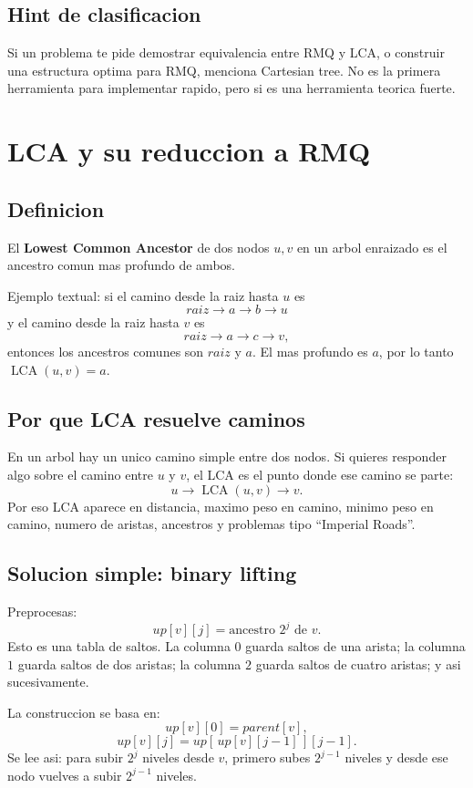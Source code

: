 \documentclass[10pt]{article}
\newcommand{\LCA}{\operatorname{LCA}}
\begin{document}
\subsection{Hint de clasificacion}
Si un problema te pide demostrar equivalencia entre RMQ y LCA, o construir una
estructura optima para RMQ, menciona Cartesian tree. No es la primera herramienta
para implementar rapido, pero si es una herramienta teorica fuerte.

\newpage
\section{LCA y su reduccion a RMQ}

\subsection{Definicion}
El \textbf{Lowest Common Ancestor} de dos nodos $u,v$ en un arbol enraizado es
el ancestro comun mas profundo de ambos.

Ejemplo textual: si el camino desde la raiz hasta $u$ es
\[
raiz\to a\to b\to u
\]
y el camino desde la raiz hasta $v$ es
\[
raiz\to a\to c\to v,
\]
entonces los ancestros comunes son $raiz$ y $a$. El mas profundo es $a$, por lo
tanto $\LCA(u,v)=a$.

\subsection{Por que LCA resuelve caminos}
En un arbol hay un unico camino simple entre dos nodos. Si quieres responder
algo sobre el camino entre $u$ y $v$, el LCA es el punto donde ese camino se
parte:
\[
u \to \LCA(u,v) \to v.
\]
Por eso LCA aparece en distancia, maximo peso en camino, minimo peso en camino,
numero de aristas, ancestros y problemas tipo ``Imperial Roads''.

\subsection{Solucion simple: binary lifting}
Preprocesas:
\[
up[v][j] = \text{ancestro }2^j\text{ de }v.
\]
Esto es una tabla de saltos. La columna $0$ guarda saltos de una arista; la
columna $1$ guarda saltos de dos aristas; la columna $2$ guarda saltos de
cuatro aristas; y asi sucesivamente.

La construccion se basa en:
\[
up[v][0]=parent[v],
\]
\[
up[v][j]=up[\,up[v][j-1]\,][j-1].
\]
Se lee asi: para subir $2^j$ niveles desde $v$, primero subes $2^{j-1}$ niveles
y desde ese nodo vuelves a subir $2^{j-1}$ niveles.
\end{document}
